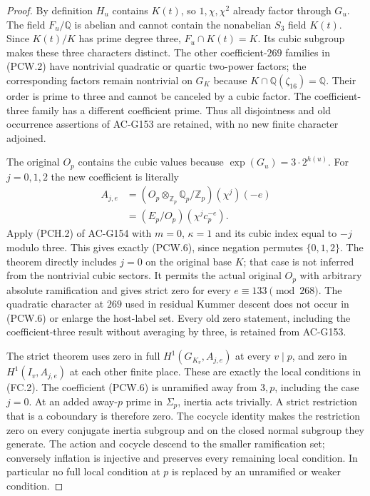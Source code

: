 \begin{proof}
By definition $H_u$ contains $K(t)$, so $1,\chi,\chi^2$
already factor through $G_u$.
The field $F_u/\mathbb Q$ is abelian and cannot contain the
nonabelian $S_3$ field $K(t)$.
Since $K(t)/K$ has prime degree three, $F_u\cap K(t)=K$.
Its cubic subgroup makes these three characters distinct.
The other coefficient-$269$ families in (PCW.2) have nontrivial
quadratic or quartic two-power factors; the corresponding factors
remain nontrivial on $G_K$ because $K\cap\mathbb Q(\zeta_{16})
=\mathbb Q$.  Their order is prime to three and cannot be
canceled by a cubic factor.
The coefficient-three family has a different coefficient prime.
Thus all disjointness and old occurrence assertions of AC-G153
are retained, with no new finite character adjoined.

The original $O_p$ contains the cubic values because
$\exp(G_u)=3\cdot2^{h(u)}$.
For $j=0,1,2$ the new coefficient is literally
\[
 \begin{aligned}
 A_{j,e}&=(O_p\otimes_{\mathbb Z_p}\mathbb Q_p/\mathbb Z_p)
                                                  (\chi^j)(-e)\\
        &=(E_p/O_p)(\chi^jc_p^{-e}).
 \end{aligned}
 \tag{PCW.6}
\]
Apply (PCH.2) of AC-G154 with $m=0$, $\kappa=1$ and
its cubic index equal to $-j$ modulo three.  This gives exactly
(PCW.6), since negation permutes $\{0,1,2\}$.
The theorem directly includes $j=0$ on the original base $K$;
that case is not inferred from the nontrivial cubic sectors.
It permits the actual original $O_p$ with arbitrary absolute
ramification and gives strict zero for every
$e\equiv133\pmod{268}$.
The quadratic character at $269$ used in residual Kummer descent
does not occur in (PCW.6) or enlarge the host-label set.
Every old zero statement, including the coefficient-three result
without averaging by three, is retained from AC-G153.

The strict theorem uses zero in full
$H^1(G_{K_v},A_{j,e})$ at every $v\mid p$, and zero in
$H^1(I_v,A_{j,e})$ at each other finite place.
These are exactly the local conditions in (FC.2).
The coefficient (PCW.6) is unramified away from $3,p$,
including the case $j=0$.
At an added away-$p$ prime in $\Sigma_p$, inertia acts trivially.
A strict restriction that is a coboundary is therefore zero.
The cocycle identity makes the restriction zero on every conjugate
inertia subgroup and on the closed normal subgroup they generate.
The action and cocycle descend to the smaller ramification set;
conversely inflation is injective and preserves every remaining
local condition.  In particular no full local condition at $p$
is replaced by an unramified or weaker condition.


\end{proof}
